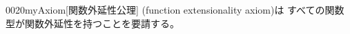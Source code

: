 \documentclass[index]{subfiles}
\begin{document}
\begin{myBlock}{0020}{myAxiom}[関数外延性公理]
  (function extensionality axiom)は
  すべての関数型が関数外延性を持つことを要請する。
\end{myBlock}
\end{document}
